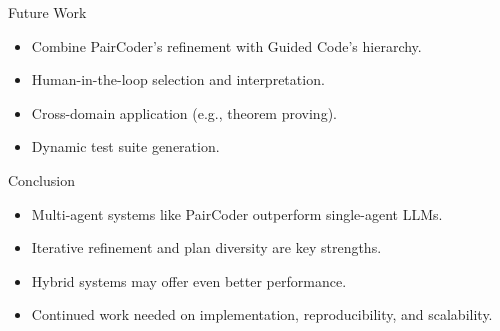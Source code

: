 \documentclass{beamer}
\begin{document}
\begin{frame}{Future Work}
\begin{itemize}
    \item Combine PairCoder's refinement with Guided Code’s hierarchy.
    \item Human-in-the-loop selection and interpretation.
    \item Cross-domain application (e.g., theorem proving).
    \item Dynamic test suite generation.
\end{itemize}
\end{frame}

\begin{frame}{Conclusion}
\begin{itemize}
    \item Multi-agent systems like PairCoder outperform single-agent LLMs.
    \item Iterative refinement and plan diversity are key strengths.
    \item Hybrid systems may offer even better performance.
    \item Continued work needed on implementation, reproducibility, and scalability.
\end{itemize}
\end{frame}
\end{document}
